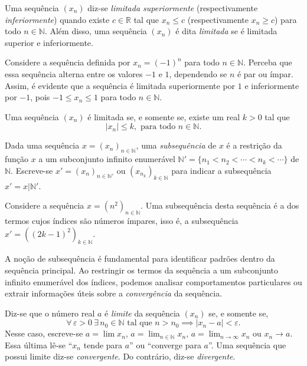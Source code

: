 \begin{definicao}
	Uma sequência $(x_n)$ diz-se \textit{limitada superiormente} (respectivamente \textit{inferiormente}) quando existe $c\in \mathbb{R}$ tal que $x_n \leq c$ (respectivamente $x_n \geq c$) para todo $n\in \mathbb{N}$. Além disso, uma sequência $(x_n)$ é dita \textit{limitada} se é limitada superior e inferiormente.
\end{definicao}

\begin{exemplo}
Considere a sequência definida por \( x_n = (-1)^n \) para todo \( n \in \mathbb{N} \). Perceba que essa sequência alterna entre os valores \( -1 \) e \( 1 \), dependendo se \( n \) é par ou ímpar. Assim, é evidente que a sequência é limitada superiormente por \( 1 \) e inferiormente por \( -1 \), pois \( -1 \leq x_n \leq 1 \) para todo \( n \in \mathbb{N} \).
\end{exemplo}

\begin{proposicao}
	Uma sequência $(x_n)$ é limitada se, e somente se, existe um real $k>0$ tal que $$| x_n| \leq k, \text{ para todo } n\in \mathbb{N}.$$
\end{proposicao}

\begin{definicao}[Subsequência]
	Dada uma sequência $x = (x_n)_{n\in \mathbb{N}}$, uma \textit{subsequência} de $x$ é a restrição da função $x$ a um subconjunto infinito enumerável $\mathbb{N}'= \{n_1 < n_2 < \cdots < n_k < \cdots \}$ de $\mathbb{N}$. Escreve-se $x' = (x_n)_{n\in \mathbb{N}'}$ ou $(x_{n_k})_{k\in \mathbb{N}}$ para indicar a subsequência $x' = x|\mathbb{N}'$.
\end{definicao}


\begin{exemplo}
	Considere a sequência \( x = (n^2)_{n \in \mathbb{N}} \). 
	Uma subsequência desta sequência é a dos termos cujos índices são números ímpares, isso é, a subsequência \( x' = ((2k-1)^2)_{k \in \mathbb{N}} \).
\end{exemplo}

A noção de subsequência é fundamental para identificar padrões dentro da sequência principal. Ao restringir os termos da sequência a um subconjunto infinito enumerável dos índices, podemos analisar comportamentos particulares ou extrair informações úteis sobre a \textit{convergência} da sequência.

\begin{definicao}
	Diz-se que o número real $a$ é \textit{limite} da sequência $(x_n)$ se, e somente se, $$\forall\,  \varepsilon>0 \ \exists \, n_0 \in \mathbb{N} \text{ tal que } n>n_0 \implies |x_n-a| < \varepsilon.$$ Nesse caso, escreve-se $a = \lim x_n$, $a = \lim_{n\in \mathbb{N}} x_n$, $a=\lim_{n\to\infty} x_n$ ou $x_n \to a$. Essa última lê-se ``$x_n$ tende para $a$'' ou ``converge para $a$''. Uma sequência que possui limite diz-se \textit{convergente}. Do contrário, diz-se \textit{divergente}.
\end{definicao}

